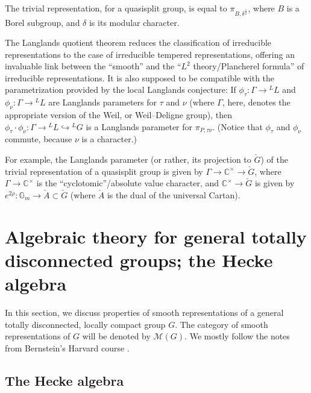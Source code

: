 \begin{example}
 \label{example-trivial-representation}
The trivial representation, for a quasisplit group, is equal to $\pi_{B, \delta^\frac{1}{2}}$, where $B$ is a Borel subgroup, and $\delta$ is its modular character.
\end{example}


\begin{remark}
 \label{remark-Langlands-classification}
The Langlands quotient theorem reduces the classification of irreducible representations to the case of irreducible tempered representations, offering an invaluable link between the ``smooth'' and the ``$L^2$ theory/Plancherel formula'' of irreducible representations. It is also supposed to be compatible with the parametrization provided by the local Langlands conjecture: If $\phi_\tau: \Gamma\to {^LL}$ and $\phi_\nu: \Gamma\to {^LL}$ are Langlands parameters for $\tau$ and $\nu$ (where $\Gamma$, here, denotes the appropriate version of the Weil, or Weil--Deligne group), then $\phi_\tau\cdot\phi_\nu: \Gamma\to {^LL}\hookrightarrow {^LG}$ is a Langlands parameter for $\pi_{P,\tau\nu}$. (Notice that $\phi_\tau$ and $\phi_\nu$ commute, because $\nu$ is a character.)

For example, the Langlands parameter (or rather, its projection to $\check G$) of the trivial representation of a quasisplit group is given by $\Gamma \to \mathbb C^\times \to \check G$, where $\Gamma \to \mathbb C^\times$ is the ``cyclotomic''/absolute value character, and $\mathbb C^\times \to \check G$ is given by $e^{2\rho}: \mathbb G_m\to \check A\subset\check G$ (where $\check A$ is the dual of the universal Cartan).
\end{remark}

\section{Algebraic theory for general totally disconnected groups; the Hecke algebra}
\label{section-td}

In this section, we discuss properties of smooth representations of a general totally disconnected, locally compact group $G$. The category of smooth representations of $G$ will be denoted by $\mathcal M(G)$. We mostly follow the notes from Bernstein's Harvard course \cite{Bernstein-padic}.


\subsection{The Hecke algebra}
\label{subsection-Hecke-algebra}

